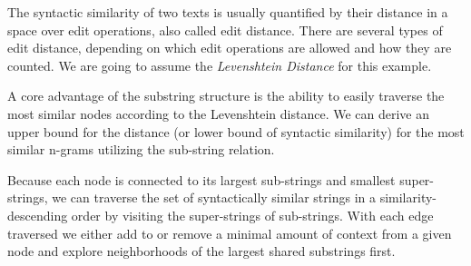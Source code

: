 \noindent
The syntactic similarity of two texts is usually quantified by their distance in a space over edit operations, also called edit distance. There are several types of edit distance, depending on which edit operations are allowed and how they are counted. We are going to assume the \textit{Levenshtein Distance} for this example.

\noindent
A core advantage of the substring structure is the ability to easily traverse the most similar nodes according to the Levenshtein distance. We can derive an upper bound for the distance (or lower bound of syntactic similarity) for the most similar n-grams utilizing the sub-string relation.

\noindent
Because each node is connected to its largest sub-strings and smallest super-strings, we can traverse the set of syntactically similar strings in a similarity-descending order by visiting the super-strings of sub-strings. With each edge traversed we either add to or remove a minimal amount of context from a given node and explore neighborhoods of the largest shared substrings first.


